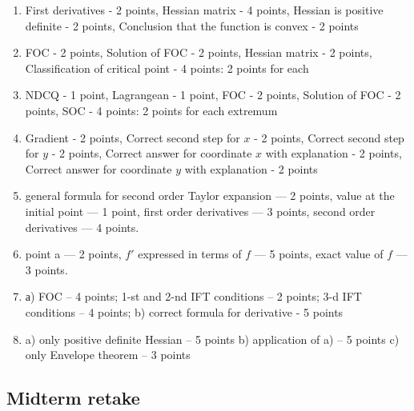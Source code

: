 \documentclass[12pt]{article} %
\theoremstyle{definition} %
\begin{document}
\begin{enumerate}
  \item First derivatives - 2 points, Hessian matrix - 4 points, Hessian is positive definite - 2 points, Conclusion that the function is convex - 2 points
  \item FOC - 2 points, Solution of FOC - 2 points, Hessian matrix - 2 points, Classification of critical point - 4 points: 2 points for each

  \item NDCQ - 1 point,  Lagrangean - 1 point, FOC - 2 points, Solution of FOC - 2 points, SOC - 4 points: 2 points for each extremum
\item
Gradient - 2 points, Correct second step for $x$ - 2 points, Correct second step for $y$ - 2 points, Correct answer for coordinate $x$ with explanation - 2 points, Correct answer for coordinate $y$ with explanation - 2 points
\item general formula for second order Taylor expansion — 2 points, value at the initial point — 1 point, first order derivatives — 3 points, second order derivatives — 4 points.
\item point a — 2 points, $f'$ expressed in terms of $f$ — 5 points, exact value of $f$ — 3 points.
\item
а) FOC – 4 points; 1-st and 2-nd IFT conditions – 2 points; 3-d IFT conditions – 4 points;
b) correct formula for derivative - 5 points
\item
a) only positive definite Hessian – 5 points
b) application of a) – 5 points
c) only Envelope theorem – 3 points
\end{enumerate}

\subsection{Midterm retake}
\end{document}
